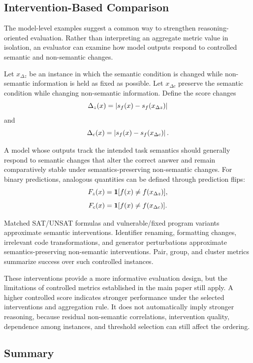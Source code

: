 \documentclass[acmsmall,screen,review,anonymous]{acmart}
\begin{document}
\subsection{Intervention-Based Comparison}
\label{sec:supp-instantiation-interventions}

The model-level examples suggest a common way to strengthen reasoning-oriented
evaluation. Rather than interpreting an aggregate metric value in isolation,
an evaluator can examine how model outputs respond to controlled semantic and
non-semantic changes.

Let \(x_{\Delta z}\) be an instance in which the semantic condition is changed
while non-semantic information is held as fixed as possible. Let
\(x_{\Delta c}\) preserve the semantic condition while changing
non-semantic information. Define the score changes
\[
\Delta_z(x)
=
\left|
s_{f}(x)-s_{f}(x_{\Delta z})
\right|
\]
and
\[
\Delta_c(x)
=
\left|
s_{f}(x)-s_{f}(x_{\Delta c})
\right|.
\]

A model whose outputs track the intended task semantics should generally
respond to semantic changes that alter the correct answer and remain
comparatively stable under semantics-preserving non-semantic changes. For
binary predictions, analogous quantities can be defined through prediction
flips:
\[
F_z(x)
=
\mathbf{1}
[
f(x)\neq f(x_{\Delta z})
],
\]
\[
F_c(x)
=
\mathbf{1}
[
f(x)\neq f(x_{\Delta c})
].
\]

Matched SAT/UNSAT formulas and vulnerable/fixed program variants approximate
semantic interventions. Identifier renaming, formatting changes, irrelevant
code transformations, and generator perturbations approximate
semantics-preserving non-semantic interventions. Pair, group, and cluster
metrics summarize success over such controlled instances.

These interventions provide a more informative evaluation design, but the
limitations of controlled metrics established in the main paper still apply.
A higher controlled score indicates stronger performance under the selected
interventions and aggregation rule. It does not automatically imply stronger
reasoning, because residual non-semantic correlations, intervention quality,
dependence among instances, and threshold selection can still affect the
ordering.

\subsection{Summary}
\label{sec:supp-instantiation-summary}
\end{document}
